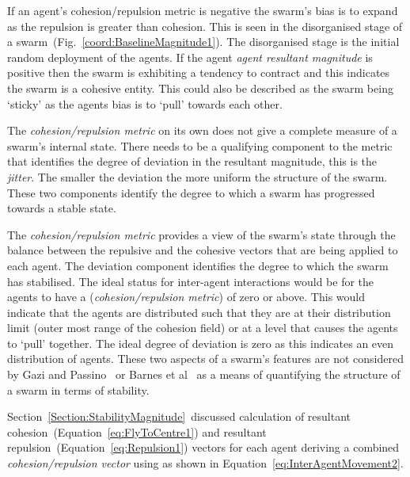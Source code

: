 \documentclass{ieeeaccess}
\begin{document}
If an agent's {cohesion/repulsion metric} is negative the swarm's bias is to expand as the repulsion is greater than cohesion. This is seen in the disorganised stage of a swarm~(Fig.~\ref{coord:BaselineMagnitude1}). The disorganised stage is the initial random deployment of the agents. If the agent \textit{agent resultant magnitude} is positive then the swarm is exhibiting a tendency to contract and this indicates the swarm is a cohesive entity. This could also be described as the swarm being `sticky' as the agents bias is to `pull' towards each other.

The \textit{cohesion/repulsion metric} on its own does not give a complete measure of a swarm's internal state. There needs to be a qualifying component to the metric that identifies the degree of deviation in the resultant magnitude, this is the \textit{jitter}. The smaller the deviation the more uniform the structure of the swarm. These two components identify the degree to which a swarm has progressed towards a stable state.
 
The \textit{cohesion/repulsion metric} provides a view of the swarm's state through the balance between the repulsive and the cohesive vectors that are being applied to each agent. The deviation component identifies the degree to which the swarm has stabilised. The ideal status for inter-agent interactions would be for the agents to have a (\textit{cohesion/repulsion metric}) of zero or above. This would indicate that the agents are distributed such that they are at their distribution limit (outer most range of the cohesion field) or at a level that causes the agents to `pull' together. The ideal degree of deviation is zero as this indicates an even distribution of agents. These two aspects of a swarm's features are not considered by Gazi and Passino~\cite{GP:11} or Barnes et al~\cite{BFV:07} as a means of quantifying the structure of a swarm in terms of stability.

Section~\ref{Section:StabilityMagnitude}~discussed calculation of resultant cohesion~(Equation~\ref{eq:FlyToCentre1}) and resultant repulsion~(Equation~\ref{eq:Repulsion1}) vectors for each agent deriving a combined \textit{cohesion/repulsion vector} using as shown in Equation~\ref{eq:InterAgentMovement2}. 

\end{document}
